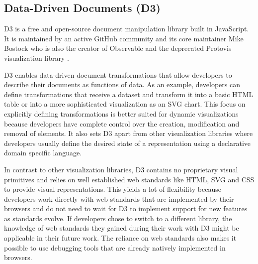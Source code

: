 \subsection{Data-Driven Documents (D3)}

D3 \parencite{D3} is a free and open-source document manipulation library built in JavaScript. It is maintained by an active GitHub community and its core maintainer Mike Bostock who is also the creator of Observable \parencite{Observable} and the deprecated Protovis visualization library \parencite{Protovis}.

D3 enables data-driven document transformations that allow developers to describe their documents as functions of data. As an example, developers can define transformations that receive a dataset and transform it into a basic HTML table or into a more sophisticated visualization as an SVG chart. This focus on explicitly defining transformations is better suited for dynamic visualizations because developers have complete control over the creation, modification and removal of elements. It also sets D3 apart from other visualization libraries where developers usually define the desired state of a representation using a declarative domain specific language.

In contrast to other visualization libraries, D3 contains no proprietary visual primitives and relies on well established web standards like HTML, SVG and CSS to provide visual representations. This yields a lot of flexibility because developers work directly with web standards that are implemented by their browsers and do not need to wait for D3 to implement support for new features as standards evolve. If developers chose to switch to a different library, the knowledge of web standards they gained during their work with D3 might be applicable in their future work. The reliance on web standards also makes it possible to use debugging tools that are already natively implemented in browsers.

